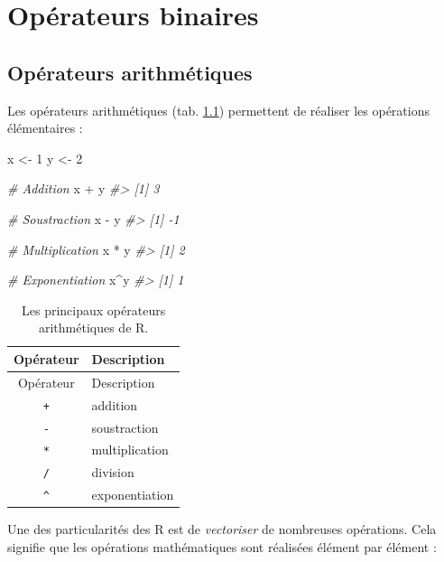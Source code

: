 \documentclass[
  french,
]{scrbook}
\newenvironment{Shaded}{\begin{snugshade}}{\end{snugshade}}
\newcommand{\CommentTok}[1]{\textcolor[rgb]{0.56,0.35,0.01}{\textit{#1}}}
\newcommand{\DecValTok}[1]{\textcolor[rgb]{0.00,0.00,0.81}{#1}}
\newcommand{\NormalTok}[1]{#1}
\newcommand{\OtherTok}[1]{\textcolor[rgb]{0.56,0.35,0.01}{#1}}
\newcommand{\SpecialCharTok}[1]{\textcolor[rgb]{0.00,0.00,0.00}{#1}}
\begin{document}
\hypertarget{operateurs}{%
\chapter{Opérateurs binaires}\label{operateurs}}

\hypertarget{opuxe9rateurs-arithmuxe9tiques}{%
\section{Opérateurs arithmétiques}\label{opuxe9rateurs-arithmuxe9tiques}}

Les opérateurs arithmétiques (tab. \ref{tab:operateurs-math}) permettent de réaliser les opérations élémentaires :

\begin{Shaded}
\begin{Highlighting}[]
\NormalTok{x }\OtherTok{\textless{}{-}} \DecValTok{1}
\NormalTok{y }\OtherTok{\textless{}{-}} \DecValTok{2}

\CommentTok{\# Addition}
\NormalTok{x }\SpecialCharTok{+}\NormalTok{ y}
\CommentTok{\#\textgreater{} [1] 3}

\CommentTok{\# Soustraction}
\NormalTok{x }\SpecialCharTok{{-}}\NormalTok{ y}
\CommentTok{\#\textgreater{} [1] {-}1}

\CommentTok{\# Multiplication}
\NormalTok{x }\SpecialCharTok{*}\NormalTok{ y}
\CommentTok{\#\textgreater{} [1] 2}

\CommentTok{\# Exponentiation}
\NormalTok{x}\SpecialCharTok{\^{}}\NormalTok{y}
\CommentTok{\#\textgreater{} [1] 1}
\end{Highlighting}
\end{Shaded}

\begin{longtable}[]{@{}cl@{}}
\caption{\label{tab:operateurs-math} Les principaux opérateurs arithmétiques de R.}\tabularnewline
\toprule
Opérateur & Description \\
\midrule
\endfirsthead
\toprule
Opérateur & Description \\
\midrule
\endhead
\texttt{+} & addition \\
\texttt{-} & soustraction \\
\texttt{*} & multiplication \\
\texttt{/} & division \\
\texttt{\^{}} & exponentiation \\
\bottomrule
\end{longtable}

Une des particularités des R est de \emph{vectoriser} de nombreuses opérations. Cela signifie que les opérations mathématiques sont réalisées élément par élément :
\end{document}

